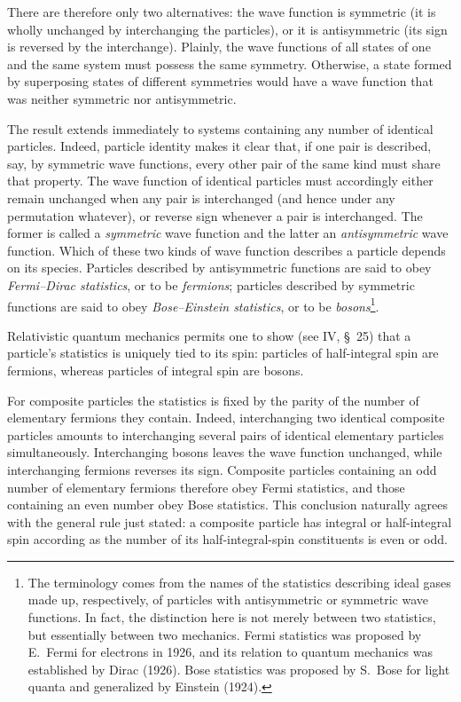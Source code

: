 There are therefore only two alternatives: the wave function is symmetric (it is wholly unchanged by interchanging the particles), or it is antisymmetric (its sign is reversed by the interchange). Plainly, the wave functions of all states of one and the same system must possess the same symmetry. Otherwise, a state formed by superposing states of different symmetries would have a wave function that was neither symmetric nor antisymmetric.

The result extends immediately to systems containing any number of identical particles. Indeed, particle identity makes it clear that, if one pair is described, say, by symmetric wave functions, every other pair of the same kind must share that property. The wave function of identical particles must accordingly either remain unchanged when any pair is interchanged (and hence under any permutation whatever), or reverse sign whenever a pair is interchanged. The former is called a \emph{symmetric} wave function and the latter an \emph{antisymmetric} wave function. Which of these two kinds of wave function describes a particle depends on its species. Particles described by antisymmetric functions are said to obey \emph{Fermi--Dirac statistics}, or to be \emph{fermions}; particles described by symmetric functions are said to obey \emph{Bose--Einstein statistics}, or to be \emph{bosons}\footnote{The terminology comes from the names of the statistics describing ideal gases made up, respectively, of particles with antisymmetric or symmetric wave functions. In fact, the distinction here is not merely between two statistics, but essentially between two mechanics. Fermi statistics was proposed by E.~Fermi for electrons in 1926, and its relation to quantum mechanics was established by Dirac (1926). Bose statistics was proposed by S.~Bose for light quanta and generalized by Einstein (1924).}.

Relativistic quantum mechanics permits one to show (see IV, §~25) that a particle's statistics is uniquely tied to its spin: particles of half-integral spin are fermions, whereas particles of integral spin are bosons.

For composite particles the statistics is fixed by the parity of the number of elementary fermions they contain. Indeed, interchanging two identical composite particles amounts to interchanging several pairs of identical elementary particles simultaneously. Interchanging bosons leaves the wave function unchanged, while interchanging fermions reverses its sign. Composite particles containing an odd number of elementary fermions therefore obey Fermi statistics, and those containing an even number obey Bose statistics. This conclusion naturally agrees with the general rule just stated: a composite particle has integral or half-integral spin according as the number of its half-integral-spin constituents is even or odd.

